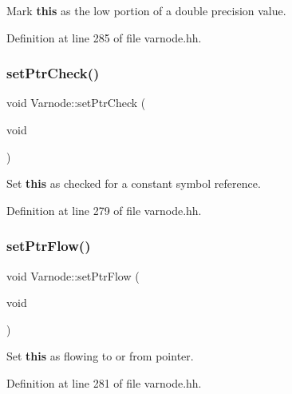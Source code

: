 Mark {\bfseries{this}} as the low portion of a double precision value. 



Definition at line 285 of file varnode.\+hh.

\mbox{\label{class_varnode_a5e156fe05fb86c5efda500797872692b}} 
\subsubsection{\texorpdfstring{setPtrCheck()}{setPtrCheck()}}
{\footnotesize\ttfamily void Varnode\+::set\+Ptr\+Check (\begin{DoxyParamCaption}\item[{void}]{ }\end{DoxyParamCaption})\hspace{0.3cm}{\ttfamily [inline]}}



Set {\bfseries{this}} as checked for a constant symbol reference. 



Definition at line 279 of file varnode.\+hh.

\mbox{\label{class_varnode_a94142543eb3ac9cbf132e77c564ec04a}} 
\subsubsection{\texorpdfstring{setPtrFlow()}{setPtrFlow()}}
{\footnotesize\ttfamily void Varnode\+::set\+Ptr\+Flow (\begin{DoxyParamCaption}\item[{void}]{ }\end{DoxyParamCaption})\hspace{0.3cm}{\ttfamily [inline]}}



Set {\bfseries{this}} as flowing to or from pointer. 



Definition at line 281 of file varnode.\+hh.

\mbox{\label{class_varnode_a5f5028eda92941ae7f12728c16e28243}} 
